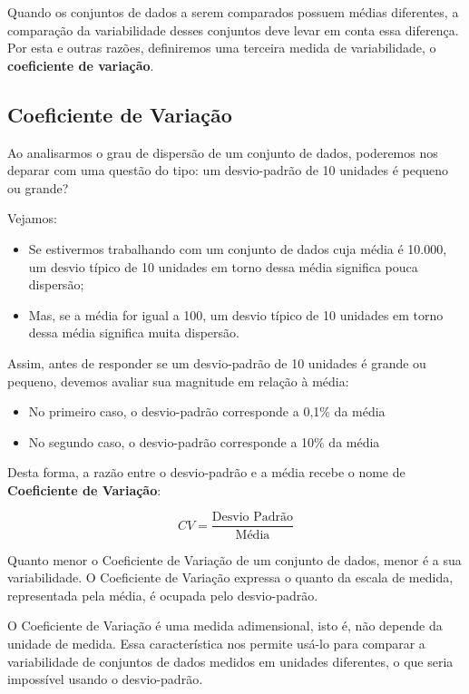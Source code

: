 \documentclass[
]{book}
\providecommand{\tightlist}{%
  \setlength{\itemsep}{0pt}\setlength{\parskip}{0pt}}
\begin{document}
Quando os conjuntos de dados a serem comparados possuem médias diferentes, a comparação da variabilidade desses conjuntos deve levar em conta essa diferença. Por esta e outras razões, definiremos uma terceira medida de variabilidade, o \textbf{coeficiente de variação}.

\hypertarget{coeficiente-de-variauxe7uxe3o}{%
\subsection{Coeficiente de Variação}\label{coeficiente-de-variauxe7uxe3o}}

Ao analisarmos o grau de dispersão de um conjunto de dados, poderemos nos deparar com uma questão do tipo: um desvio-padrão de 10 unidades é pequeno ou grande?

Vejamos:

\begin{itemize}
\tightlist
\item
  Se estivermos trabalhando com um conjunto de dados cuja média é 10.000, um desvio típico de 10 unidades em torno dessa média significa pouca dispersão;
\item
  Mas, se a média for igual a 100, um desvio típico de 10 unidades em torno dessa média significa muita dispersão.
\end{itemize}

Assim, antes de responder se um desvio-padrão de 10 unidades é grande ou pequeno, devemos avaliar sua magnitude em relação à média:

\begin{itemize}
\tightlist
\item
  No primeiro caso, o desvio-padrão corresponde a 0,1\% da média
\item
  No segundo caso, o desvio-padrão corresponde a 10\% da média
\end{itemize}

Desta forma, a razão entre o desvio-padrão e a média recebe o nome de \textbf{Coeficiente de Variação}:

\begin{equation*}
CV=\frac{\text{Desvio Padrão}}{\text{Média}}
\end{equation*}

Quanto menor o Coeficiente de Variação de um conjunto de dados, menor é a sua variabilidade. O Coeficiente de Variação expressa o quanto da escala de medida, representada pela média, é ocupada pelo desvio-padrão.

O Coeficiente de Variação é uma medida adimensional, isto é, não depende da unidade de medida. Essa característica nos permite usá-lo para comparar a variabilidade de conjuntos de dados medidos em unidades diferentes, o que seria impossível usando o desvio-padrão.
\end{document}
